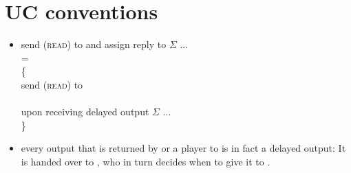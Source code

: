 \section{UC conventions}
  \begin{itemize}
    \item send (\textsc{read}) to \ledger{} and assign reply to $\Sigma$ ... \\
    = \\
    \{ \\
    send (\textsc{read}) to \ledger{} \\ \ \\
    upon receiving delayed output $\Sigma$ ... \\
    \}
    \item every output that is returned by \fpaynet{} or a player to
    \environment{} is in fact a delayed output: It is handed over to
    \adversary{}, who in turn decides when to give it to \environment{}.
  \end{itemize}
